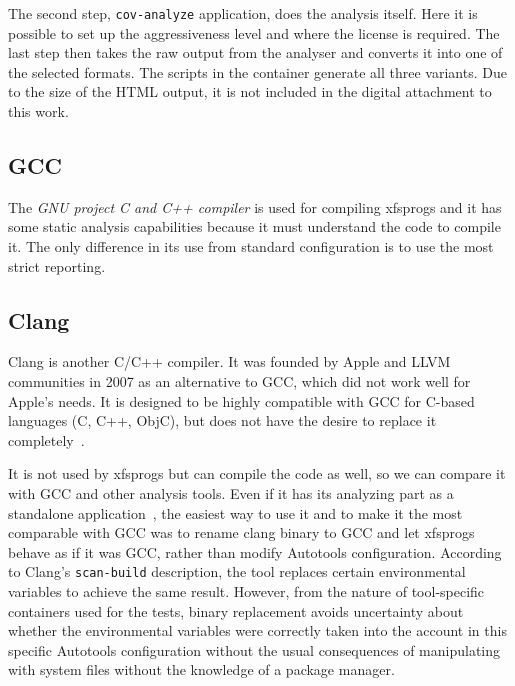 The second step, {\tt cov-analyze} application, does the analysis itself. Here
it is possible to set up the aggressiveness level and where the license is
required. The last step then takes the raw output from the analyser and
converts it into one of the selected formats. The scripts in the container
generate all three variants. Due to the size of the HTML output, it is not
included in the digital attachment to this work.

\subsection{GCC}
The {\em GNU project C and C++ compiler} is used for compiling xfsprogs and it
has some static analysis capabilities because it must understand the code to
compile it. The only difference in its use from standard configuration is to
use the most strict reporting.

\subsection{Clang}
Clang is another C/C++ compiler. It was founded by Apple and LLVM communities
in 2007 as an alternative to GCC, which did not work well for Apple's needs. It
is designed to be highly compatible with GCC for C-based languages (C, C++,
ObjC), but does not have the desire to replace it
completely~\cite{ClangAnnouncement}.

It is not used by xfsprogs but can compile the code as well, so we can compare
it with GCC and other analysis tools. Even if it has its analyzing part as a
standalone application~\cite{ClangAnalyser}, the easiest way to use it and to
make it the most comparable with GCC was to rename clang binary to GCC and let
xfsprogs behave as if it was GCC, rather than modify Autotools configuration.
According to Clang's {\tt scan-build} description, the tool replaces certain
environmental variables to achieve the same result. However, from the nature of
tool-specific containers used for the tests, binary replacement avoids
uncertainty about whether the environmental variables were correctly taken into
the account in this specific Autotools configuration without the usual
consequences of manipulating with system files without the knowledge of a
package manager.

